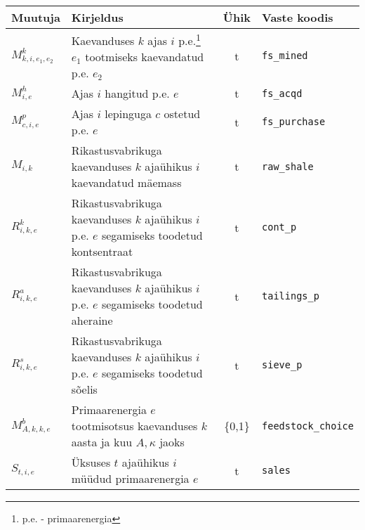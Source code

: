 \begin{landscape}
\begin{longtable}{l l c l}
Muutuja & Kirjeldus & Ühik & Vaste koodis\\
\hline
$M^k_{k,i,e_1, e_2}$ & Kaevanduses $k$ ajas $i$ p.e.\footnote{p.e. - primaarenergia} $e_1$ tootmiseks kaevandatud p.e. $e_2$ & t &  \texttt{fs\_mined}\\
$M^h_{i,e}$ & Ajas $i$ hangitud p.e. $e$ & t &  \texttt{fs\_acqd}\\
$M^p_{c,i,e}$ & Ajas $i$ lepinguga $c$ ostetud p.e. $e$ & t &  \texttt{fs\_purchase}\\

$M_{i,k}$ & Rikastusvabrikuga kaevanduses $k$ ajaühikus $i$ kaevandatud mäemass & t & \texttt{raw\_shale}\\

$R^k_{i,k,e}$& Rikastusvabrikuga kaevanduses $k$ ajaühikus $i$ p.e. $e$ segamiseks toodetud kontsentraat & t & \texttt{cont\_p}\\
$R^a_{i,k,e}$& Rikastusvabrikuga kaevanduses $k$ ajaühikus $i$ p.e. $e$ segamiseks toodetud aheraine & t & \texttt{tailings\_p}\\
$R^s_{i,k,e}$& Rikastusvabrikuga kaevanduses $k$ ajaühikus $i$ p.e. $e$ segamiseks toodetud sõelis & t & \texttt{sieve\_p}\\
$M^b_{A, k, k,e}$ & Primaarenergia $e$ tootmisotsus kaevanduses $k$ aasta ja kuu $A,\kappa$  jaoks &  \{0,1\} & \texttt{feedstock\_choice}\\
$S_{t,i,e}$ & Üksuses $t$ ajaühikus $i$ müüdud primaarenergia $e$ & t & \texttt{sales}\\


\end{longtable}
\end{landscape}
